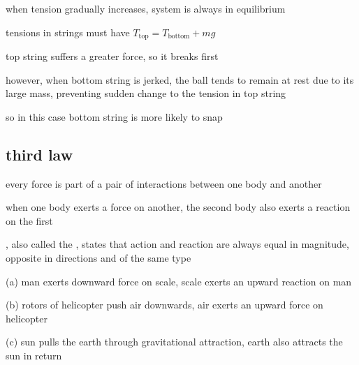 \begin{soln}
when tension gradually increases, system is always in equilibrium

tensions in strings must have $T_\text{top} = T_\text{bottom} + mg$

top string suffers a greater force, so it breaks first
	
however, when bottom string is jerked, the ball tends to remain at rest due to its large mass, preventing sudden change to the tension in top string

so in this case bottom string is more likely to snap 
\end{soln}





\subsection{third law}

every force is part of a pair of interactions between one body and another

when one body exerts a force on another, the second body also exerts a reaction on the first

\begin{ilight}
	, also called the , states that action and reaction are always equal in magnitude, opposite in directions and of the same type
\end{ilight}


\begin{soln}(a) man exerts downward force on scale, scale exerts an upward reaction on man

(b) rotors of helicopter push air downwards, air exerts an upward force on helicopter

(c) sun pulls the earth through gravitational attraction, earth also attracts the sun in return \end{soln}


